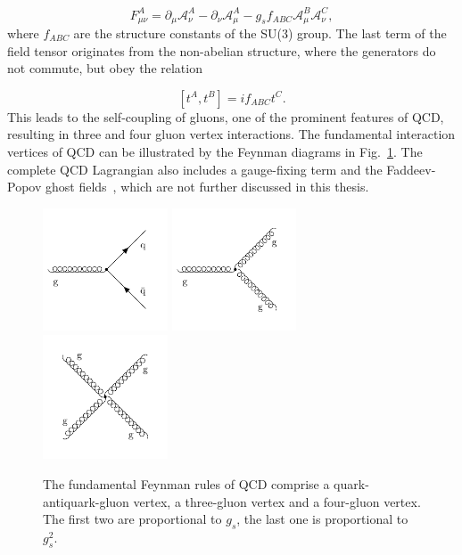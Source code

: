 \begin{equation*}
    F_{\mu\nu}^A = \partial_\mu \mathcal{A}_\nu^A - \partial_{\nu}
    \mathcal{A}_{\mu}^A - g_s f_{ABC} \mathcal{A}_{\mu}^B
    \mathcal{A}_{\nu}^C,
\end{equation*}
%
where $f_{ABC}$ are the structure constants of the SU(3) group. The last term of
the field tensor originates from the non-abelian structure, where the generators
do not commute, but obey the relation

\begin{equation*}
    \left[t^A, t^B \right] = if_{ABC} t^{C}.
\end{equation*}
%
This leads to the self-coupling of gluons, one of the prominent features of QCD,
resulting in three and four gluon vertex interactions. The fundamental
interaction vertices of QCD can be illustrated by the Feynman diagrams in
Fig.~\ref{fig:fundamental_couplings}. The complete QCD Lagrangian also includes
a gauge-fixing term and the Faddeev-Popov ghost fields~\cite{Faddeev:1967fc},
which are not further discussed in this thesis.

\begin{figure}[tb] 
    \centering
    \includegraphics[width=0.33\textwidth]{figures/drawings/feynman/gqq.pdf}\hfill
    \includegraphics[width=0.33\textwidth]{figures/drawings/feynman/ggg.pdf}\hfill
    \includegraphics[width=0.33\textwidth]{figures/drawings/feynman/gggg.pdf}\hfill
    \caption[Fundamental vertices of QCD]{The fundamental Feynman rules of QCD
    comprise a quark-antiquark-gluon vertex, a three-gluon vertex and a four-gluon
    vertex. The first two are proportional to $g_{s}$, the last one is
    proportional to $g_{s}^2$.} 
    \label{fig:fundamental_couplings} 
\end{figure}

